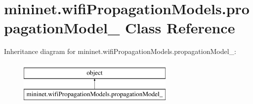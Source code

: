 \hypertarget{classmininet_1_1wifiPropagationModels_1_1propagationModel__}{\section{mininet.\-wifi\-Propagation\-Models.\-propagation\-Model\-\_\- Class Reference}
\label{classmininet_1_1wifiPropagationModels_1_1propagationModel__}
}
Inheritance diagram for mininet.\-wifi\-Propagation\-Models.\-propagation\-Model\-\_\-\-:\begin{figure}[H]
\begin{center}
\leavevmode
\includegraphics[height=2.000000cm]{classmininet_1_1wifiPropagationModels_1_1propagationModel__}
\end{center}
\end{figure}
